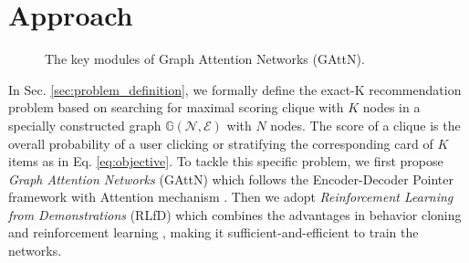 \section{Approach}
\label{sec:approach}
\begin{figure*}[th]
	\centering
	\caption{The key modules of Graph Attention Networks (GAttN).}
	\label{fig:transformer}
\end{figure*}
In Sec. \ref{sec:problem_definition}, we formally define the exact-K recommendation problem based on searching for maximal scoring clique with $K$ nodes in a
specially constructed graph $\mathbb{G}(\mathcal{N},\mathcal{E})$ with $N$ nodes. 
The score of a clique is the overall probability of a user clicking or stratifying the corresponding card of $K$ items as in Eq. \ref{eq:objective}.
To tackle this specific problem, we first propose \emph{Graph Attention Networks} (GAttN) 
which follows the Encoder-Decoder Pointer framework \cite{vinyals2015pointer} with Attention mechanism \cite{vaswani2017attention,bahdanau2014neural}.
Then we adopt \emph{Reinforcement Learning from Demonstrations} (RLfD) which combines the advantages in behavior cloning \cite{torabi2018behavioral} and reinforcement learning \cite{sutton2000policy}, making it sufficient-and-efficient to train the networks.
